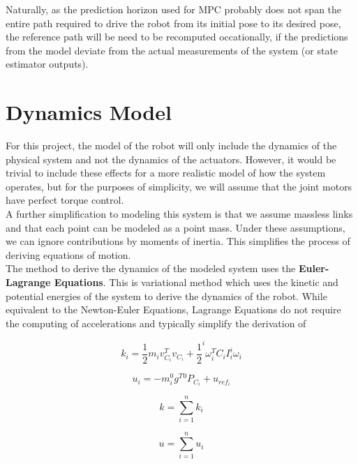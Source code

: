\documentclass[journal]{IEEEtran}
\begin{document}
Naturally, as the prediction horizon used for MPC probably does not span the entire path required to drive the robot from its initial pose to its desired pose, the reference path will be need to be recomputed occationally, if the predictions from the model deviate from the actual measurements of the system (or state estimator outputs).



\section{Dynamics Model}

For this project, the model of the robot will only include the dynamics of the physical system and not the dynamics of the actuators. However, it would be trivial to include these effects for a more realistic model of how the system operates, but for the purposes of simplicity, we will assume that the joint motors have perfect torque control. \\

A further simplification to modeling this system is that we assume massless links and that each point can be modeled as a point mass. Under these assumptions, we can ignore contributions by moments of inertia. This simplifies the process of deriving equations of motion. \\

The method to derive the dynamics of the modeled system uses the \textbf{Euler-Lagrange Equations}. This is variational method which uses the kinetic and potential energies of the system to derive the dynamics of the robot. While equivalent to the Newton-Euler Equations, Lagrange Equations do not require the computing of accelerations and typically simplify the derivation of

\begin{equation}
k_{i}=\frac{1}{2} m_{i} v_{C_{i}}^{T} v_{C_{i}}+\frac{1}{2}^{i} \omega_{i}^{T} C_{i} I_{i}^{i} \omega_{i}
\end{equation}


\begin{equation}
u_{i}=-m_{i}^{0} g^{T}{ }^{0} P_{C_{i}}+u_{r e f_{i}}
\end{equation}

\begin{equation}
k=\sum_{i=1}^{n} k_{i}
\end{equation}

\begin{equation}
u=\sum_{i=1}^{n} u_{i}
\end{equation}
\end{document}
